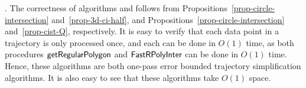 \vspace{.5ex}
.
%
The correctness of algorithms \cist and \cista follows from Propositions~\ref{prop-circle-intersection} and~\ref{prop-3d-ci-half}, and Propositions~\ref{prop-circle-intersection} and~\ref{prop-cist-Q}, respectively.
%
It is easy to verify that each data point in a trajectory is only processed once, and each can be done in $O(1)$ time,
as both procedures  ${\mathsf{getRegularPolygon}}$ and ${\mathsf{FastRPolyInter}}$ can be done in $O(1)$ time.
Hence, these algorithms are both one-pass error bounded trajectory simplification algorithms.
It is also easy to see that these algorithms take $O(1)$ space.




